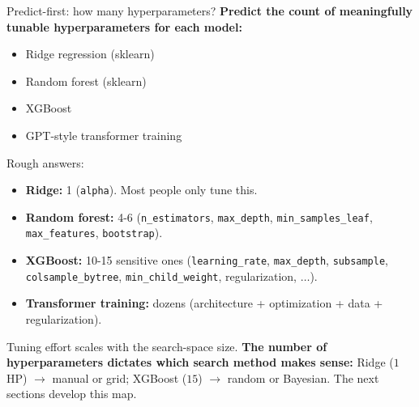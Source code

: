 \documentclass[aspectratio=169]{beamer}
\begin{document}
\begin{frame}{Predict-first: how many hyperparameters?}
  \pause
  \textbf{Predict the count of meaningfully tunable hyperparameters for each model:}
  \begin{itemize}
    \item Ridge regression (sklearn)
    \item Random forest (sklearn)
    \item XGBoost
    \item GPT-style transformer training
  \end{itemize}
  \vfill
  \pause
  Rough answers:
  \begin{itemize}
    \item \textbf{Ridge:} 1 (\texttt{alpha}). Most people only tune this.
    \item \textbf{Random forest:} 4-6 (\texttt{n\_estimators}, \texttt{max\_depth}, \texttt{min\_samples\_leaf}, \texttt{max\_features}, \texttt{bootstrap}).
    \item \textbf{XGBoost:} 10-15 sensitive ones (\texttt{learning\_rate}, \texttt{max\_depth}, \texttt{subsample}, \texttt{colsample\_bytree}, \texttt{min\_child\_weight}, regularization, $\ldots$).
    \item \textbf{Transformer training:} dozens (architecture + optimization + data + regularization).
  \end{itemize}
  Tuning effort scales with the search-space size. \textbf{The number of hyperparameters dictates which search method makes sense:} Ridge ($1$ HP) $\to$ manual or grid; XGBoost ($15$) $\to$ random or Bayesian. The next sections develop this map.
\end{frame}
\end{document}
